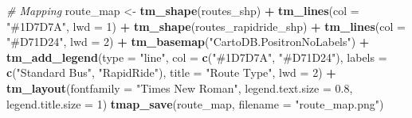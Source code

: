 \documentclass[
  12pt,
]{article}
\newenvironment{Shaded}{\begin{snugshade}}{\end{snugshade}}
\newcommand{\AttributeTok}[1]{\textcolor[rgb]{0.13,0.29,0.53}{#1}}
\newcommand{\CommentTok}[1]{\textcolor[rgb]{0.56,0.35,0.01}{\textit{#1}}}
\newcommand{\DecValTok}[1]{\textcolor[rgb]{0.00,0.00,0.81}{#1}}
\newcommand{\FloatTok}[1]{\textcolor[rgb]{0.00,0.00,0.81}{#1}}
\newcommand{\FunctionTok}[1]{\textcolor[rgb]{0.13,0.29,0.53}{\textbf{#1}}}
\newcommand{\NormalTok}[1]{#1}
\newcommand{\OtherTok}[1]{\textcolor[rgb]{0.56,0.35,0.01}{#1}}
\newcommand{\SpecialCharTok}[1]{\textcolor[rgb]{0.81,0.36,0.00}{\textbf{#1}}}
\newcommand{\StringTok}[1]{\textcolor[rgb]{0.31,0.60,0.02}{#1}}
\begin{document}
\begin{Shaded}
\begin{Highlighting}[]
\CommentTok{\# Mapping}
\NormalTok{route\_map }\OtherTok{\textless{}{-}} \FunctionTok{tm\_shape}\NormalTok{(routes\_shp) }\SpecialCharTok{+} \FunctionTok{tm\_lines}\NormalTok{(}\AttributeTok{col =} \StringTok{"\#1D7D7A"}\NormalTok{, }\AttributeTok{lwd =} \DecValTok{1}\NormalTok{) }\SpecialCharTok{+}
  \FunctionTok{tm\_shape}\NormalTok{(routes\_rapidride\_shp) }\SpecialCharTok{+} \FunctionTok{tm\_lines}\NormalTok{(}\AttributeTok{col =} \StringTok{"\#D71D24"}\NormalTok{, }\AttributeTok{lwd =} \DecValTok{2}\NormalTok{) }\SpecialCharTok{+}
  \FunctionTok{tm\_basemap}\NormalTok{(}\StringTok{"CartoDB.PositronNoLabels"}\NormalTok{) }\SpecialCharTok{+} 
  \FunctionTok{tm\_add\_legend}\NormalTok{(}\AttributeTok{type =} \StringTok{"line"}\NormalTok{,}
                \AttributeTok{col =} \FunctionTok{c}\NormalTok{(}\StringTok{"\#1D7D7A"}\NormalTok{, }\StringTok{"\#D71D24"}\NormalTok{),}
                \AttributeTok{labels =} \FunctionTok{c}\NormalTok{(}\StringTok{"Standard Bus"}\NormalTok{, }\StringTok{"RapidRide"}\NormalTok{),}
                \AttributeTok{title =} \StringTok{"Route Type"}\NormalTok{,}
                \AttributeTok{lwd =} \DecValTok{2}\NormalTok{) }\SpecialCharTok{+} 
  \FunctionTok{tm\_layout}\NormalTok{(}\AttributeTok{fontfamily =} \StringTok{"Times New Roman"}\NormalTok{,}
            \AttributeTok{legend.text.size =} \FloatTok{0.8}\NormalTok{,}
            \AttributeTok{legend.title.size =} \DecValTok{1}\NormalTok{)}
\FunctionTok{tmap\_save}\NormalTok{(route\_map, }\AttributeTok{filename =} \StringTok{"route\_map.png"}\NormalTok{)}
\end{Highlighting}
\end{Shaded}
\end{document}
